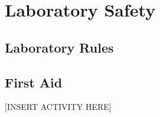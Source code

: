 \section{Laboratory Safety}

\subsection{Laboratory Rules}

\subsection{First Aid}

[INSERT ACTIVITY HERE]
